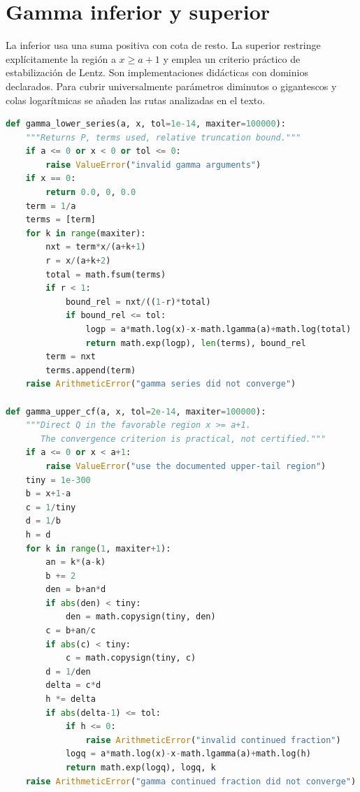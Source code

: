 \documentclass[11pt,a4paper]{article}
\theoremstyle{definition}
\begin{document}
\section{Gamma inferior y superior}
La inferior usa una suma positiva con cota de resto. La superior restringe explícitamente la región a $x\ge a+1$ y emplea un criterio práctico de estabilización de Lentz. Son implementaciones didácticas con dominios declarados. Para cubrir universalmente parámetros diminutos o gigantescos y colas logarítmicas se añaden las rutas analizadas en el texto.
\begin{lstlisting}[language=Python]
def gamma_lower_series(a, x, tol=1e-14, maxiter=100000):
    """Returns P, terms used, relative truncation bound."""
    if a <= 0 or x < 0 or tol <= 0:
        raise ValueError("invalid gamma arguments")
    if x == 0:
        return 0.0, 0, 0.0
    term = 1/a
    terms = [term]
    for k in range(maxiter):
        nxt = term*x/(a+k+1)
        r = x/(a+k+2)
        total = math.fsum(terms)
        if r < 1:
            bound_rel = nxt/((1-r)*total)
            if bound_rel <= tol:
                logp = a*math.log(x)-x-math.lgamma(a)+math.log(total)
                return math.exp(logp), len(terms), bound_rel
        term = nxt
        terms.append(term)
    raise ArithmeticError("gamma series did not converge")

def gamma_upper_cf(a, x, tol=2e-14, maxiter=100000):
    """Direct Q in the favorable region x >= a+1.
       The convergence criterion is practical, not certified."""
    if a <= 0 or x < a+1:
        raise ValueError("use the documented upper-tail region")
    tiny = 1e-300
    b = x+1-a
    c = 1/tiny
    d = 1/b
    h = d
    for k in range(1, maxiter+1):
        an = k*(a-k)
        b += 2
        den = b+an*d
        if abs(den) < tiny:
            den = math.copysign(tiny, den)
        c = b+an/c
        if abs(c) < tiny:
            c = math.copysign(tiny, c)
        d = 1/den
        delta = c*d
        h *= delta
        if abs(delta-1) <= tol:
            if h <= 0:
                raise ArithmeticError("invalid continued fraction")
            logq = a*math.log(x)-x-math.lgamma(a)+math.log(h)
            return math.exp(logq), logq, k
    raise ArithmeticError("gamma continued fraction did not converge")
\end{lstlisting}
\end{document}
